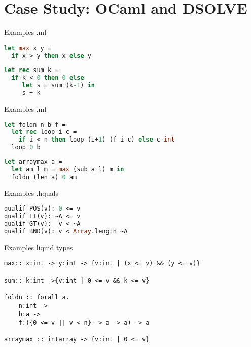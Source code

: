 \section{Case Study: OCaml and DSOLVE}


\begin{frame}[containsverbatim]{Examples .ml}

\begin{lstlisting}[language=Caml]
let max x y =
  if x > y then x else y
\end{lstlisting}

\begin{lstlisting}[language=Caml]
let rec sum k =
  if k < 0 then 0 else
     let s = sum (k-1) in
     s + k
\end{lstlisting}

\end{frame}

\begin{frame}[containsverbatim]{Examples .ml}

\begin{lstlisting}[language=Caml]
let foldn n b f = 
  let rec loop i c =
    if i < n then loop (i+1) (f i c) else c int
  loop 0 b
\end{lstlisting}

\begin{lstlisting}[language=Caml]
let arraymax a = 
  let am l m = max (sub a l) m in 
  foldn (len a) 0 am

\end{lstlisting}
\end{frame}

\begin{frame}[containsverbatim]{Examples .hquals}
\begin{lstlisting}[language=Caml]
qualif POS(v): 0 <= v 
qualif LT(v): ~A <= v
qualif GT(v):  v < ~A
qualif BND(v): v < Array.length ~A 
\end{lstlisting}
\end{frame}


\begin{frame}[containsverbatim]{Examples liquid types}
\begin{verbatim}
max:: x:int -> y:int -> {v:int | (x <= v) && (y <= v)}

sum:: k:int ->{v:int | 0 <= v && k <= v}

foldn :: forall a.
    n:int -> 
    b:a -> 
    f:({0 <= v || v < n} -> a -> a) -> a

arraymax :: intarray -> {v:int | 0 <= v}
\end{verbatim}
\end{frame}